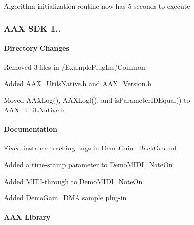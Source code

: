 \begin{DoxyItemize}
\item Algorithm initialization routine now has 5 seconds to execute 
\end{DoxyItemize}\hypertarget{a00847_aax_sdk_1p0p5}{}\subsubsection{A\+A\+X S\+D\+K 1..}\label{a00847_aax_sdk_1p0p5}
\hypertarget{a00847_aax_sdk_1p0p5_DirectoryChanges}{}\paragraph{Directory Changes}\label{a00847_aax_sdk_1p0p5_DirectoryChanges}

\begin{DoxyItemize}
\item Removed 3 files in /\+Example\+Plug\+Ins/\+Common 
\item Added \mbox{\hyperlink{a00686}{A\+A\+X\+\_\+\+Utils\+Native.\+h}} and \mbox{\hyperlink{a00707}{A\+A\+X\+\_\+\+Version.\+h}} 
\item Moved A\+A\+X\+Log(), A\+A\+X\+Logf(), and is\+Parameter\+I\+D\+Equal() to \mbox{\hyperlink{a00686}{A\+A\+X\+\_\+\+Utils\+Native.\+h}} 
\end{DoxyItemize}\hypertarget{a00847_aax_sdk_1p0p5_Documentation}{}\paragraph{Documentation}\label{a00847_aax_sdk_1p0p5_Documentation}

\begin{DoxyItemize}
\item Fixed instance tracking bugs in Demo\+Gain\+\_\+\+Back\+Ground 
\item Added a time-\/stamp parameter to Demo\+M\+I\+D\+I\+\_\+\+Note\+On 
\item Added M\+I\+D\+I-\/through to Demo\+M\+I\+D\+I\+\_\+\+Note\+On 
\item Added Demo\+Gain\+\_\+\+D\+MA sample plug-\/in 
\end{DoxyItemize}\hypertarget{a00847_aax_sdk_1p0p5_AAXLibrary}{}\paragraph{A\+A\+X Library}\label{a00847_aax_sdk_1p0p5_AAXLibrary}

